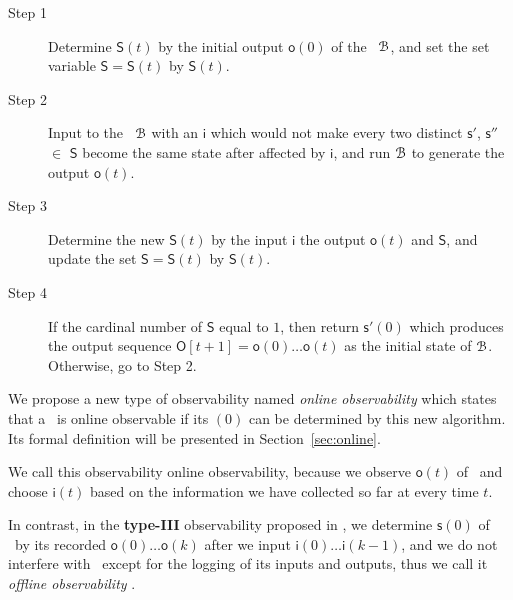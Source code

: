  
\begin{description}
	\item[Step 1]  Determine $\mathsf{S}(t)$ by the initial output $\mathsf{o}(0)$ of the \BCN\ ${\mathcal{B}}$, and set the set variable $\mathsf{S}=\mathsf{S}(t)$ by $\mathsf{S}(t)$.
	\item[Step 2] Input to the \BCN\ ${\mathcal{B}}$ with an $\mathsf{i}$ which would not make every two distinct $\mathsf{s}'$, $\mathsf{s}''$$\in$ $\mathsf{S}$ become the same state after affected by $\mathsf{i}$, and run ${\mathcal{B}}$ to generate the output $\mathsf{o}(t)$. 
	\item[Step 3] Determine the new $\mathsf{S}(t)$ by the input $\mathsf{i}$ the output $\mathsf{o}(t)$ and $\mathsf{S}$, and update the set $\mathsf{S}=\mathsf{S}(t)$ by $\mathsf{S}(t)$.
	\item[Step 4] If the cardinal number of $\mathsf{S}$ equal to $1$, then return $\mathsf{s}'(0)$ which produces the output sequence $\mathsf{O}[t+1]=\mathsf{o}(0)\ldots\mathsf{o}(t)$ as the initial state of ${\mathcal{B}}$. Otherwise, go to Step 2.
\end{description}



We propose a new type of observability named {\em online observability} which states that a \BCN\ is online observable if its \State$(0)$ can be determined by this new algorithm. Its formal definition will be presented in Section~\ref{sec:online}.  

We call this observability online observability, because we observe $\mathsf{o}(t)$ of \BCN\ and choose $\mathsf{i}(t)$ based on the information we have collected so far at every time $t$. 

In contrast, in the {\bf type-III} observability proposed in \cite{Cheng2011Identification}, we determine $\mathsf{s}(0)$ of \BCN\ by its recorded $\mathsf{o}(0)\ldots\mathsf{o}(k)$ after we input $\mathsf{i}(0)\ldots\mathsf{i}(k-1)$, and  we do not interfere with \BCN\ except for the logging of its inputs and outputs, thus we call it {\em offline observability} \cite{Cassar2017A}.
 
